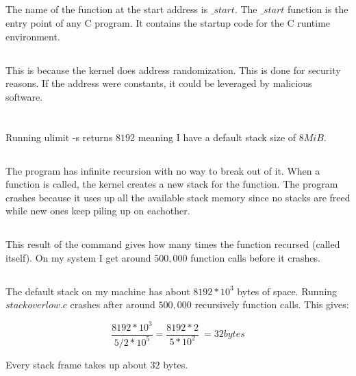 \documentclass{article}
\begin{document}
\subsection{}
The name of the function at the start address is $\_start$. The $\_start$ function is the entry point of any C program. It contains the startup code for the C runtime environment. 

\subsection{}
This is because the kernel does address randomization. This is done for security reasons. If the address were constants, it could be leveraged by malicious software. 

\section{}
\subsection{}

\subsection{}
Running ulimit -s returns $8192$ meaning I have a default stack size of $8 MiB$.

\subsection{}
The program has infinite recursion with no way to break out of it. When a function is called, the kernel creates a new stack for the function. The program crashes because it uses up all the available stack memory since no stacks are freed while new ones keep piling up on eachother.

\subsection{}
This result of the command gives how many times the function recursed (called itself). On my system I get around $500,000$ function calls before it crashes.

\subsection{}
The default stack on my machine has about $8192 * 10^3$ bytes of space. Running $stackoverlow.c$ crashes after around $500,000$ recursively function calls. This gives:

$$ \frac{8192 * 10^3}{5 / 2 * 10^5} = \frac{8192 * 2}{5 * 10^2} ~= 32 bytes $$

Every stack frame takes up about $32$ bytes.
\end{document}
